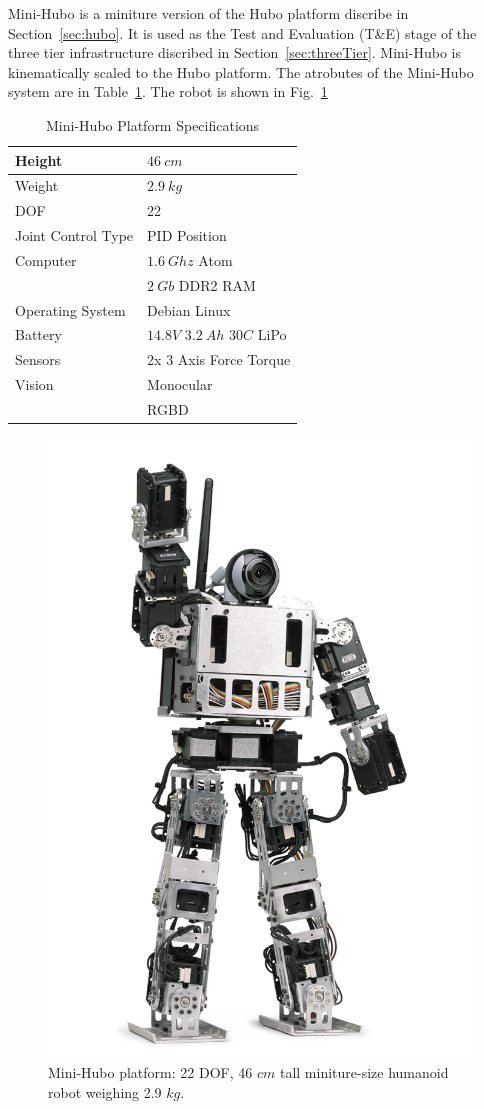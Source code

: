Mini-Hubo\cite{threeTier} is a miniture version of the Hubo platform discribe in Section~\ref{sec:hubo}.
It is used as the Test and Evaluation (T\&E) stage of the three tier infrastructure discribed in Section~\ref{sec:threeTier}.
Mini-Hubo is kinematically scaled to the Hubo platform.
The atrobutes of the Mini-Hubo system are in Table~\ref{table:huboMiniSensors}.
The robot is shown in Fig.~\ref{fig:mini-hubo}


\begin{table}
\centering
\caption{Mini-Hubo Platform Specifications}
\begin{tabular}{| l || l |}
\hline
Height      		& $46~cm$			\\
\hline
Weight			& $2.9~kg$			\\
\hline
DOF			& 22				\\
\hline
Joint Control Type	& PID Position			\\
\hline
Computer		& $1.6~Ghz$ Atom		\\
			& $2~Gb$ DDR2 RAM		\\
\hline
Operating System	& Debian Linux			\\
\hline
Battery			& $14.8V$ $3.2~Ah$ $30C$ LiPo	\\
\hline
Sensors			& 2x 3 Axis Force Torque	\\
\hline
Vision			& Monocular			\\
			& RGBD				\\
\hline
\end{tabular}
\label{table:huboMiniSensors}
\end{table}





\begin{figure}[thpb]
  \centering
\includegraphics[width=0.37\columnwidth]{./pix/mini-hubo.jpg}
  \caption{Mini-Hubo platform: 22 DOF, 46 $cm$ tall miniture-size humanoid robot weighing 2.9 $kg$.}
  \label{fig:mini-hubo}
\end{figure}

